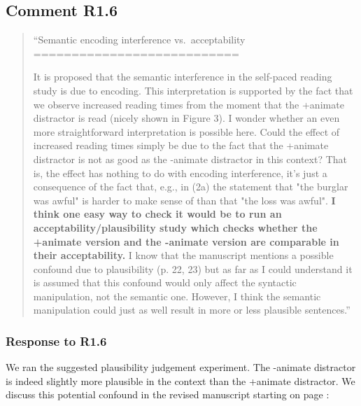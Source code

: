 \documentclass[12pt]{article}
\begin{document}
\subsection*{Comment R1.6}
\begin{quote}
``Semantic encoding interference vs.\ acceptability\\
===========================

It is proposed that the semantic interference in the self-paced reading study is due to encoding. This interpretation is supported by the fact that we observe increased reading times from the moment that the +animate distractor is read (nicely shown in Figure 3). I wonder whether an even more straightforward interpretation is possible here. Could the effect of increased reading times simply be due to the fact that the +animate distractor is not as good as the -animate distractor in this context? That is, the effect has nothing to do with encoding interference, it's just a consequence of the fact that, e.g., in (2a) the statement that "the burglar was awful" is harder to make sense of than that "the loss was awful". \textbf{I think one easy way to check it would be to run an acceptability/plausibility study which checks whether the +animate version and the -animate version are comparable in their acceptability.} I know that the manuscript mentions a possible confound due to plausibility (p. 22, 23) but as far as I could understand it is assumed that this confound would only affect the syntactic manipulation, not the semantic one. However, I think the semantic manipulation could just as well result in more or less plausible sentences.''\end{quote}

\subsubsection*{Response to R1.6}
We ran the suggested plausibility judgement experiment. The -animate distractor is indeed slightly more plausible in the context than the +animate distractor. We discuss this potential confound in the revised manuscript starting on page \pageref{plausib_anim_inan}:

\end{document}
